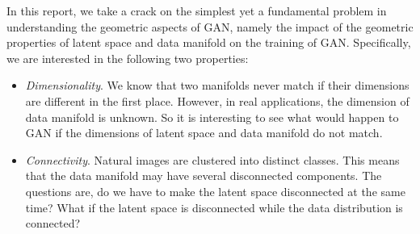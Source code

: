 In this report,
we take a crack on the simplest yet a fundamental problem in
understanding the geometric aspects of GAN,
namely the impact of the geometric properties of
latent space and data manifold on the training of GAN.
Specifically,
we are interested in the following two properties:
\begin{itemize}
    \item \emph{Dimensionality}.
        We know that two manifolds never match
        if their dimensions are different in the first place.
        However, in real applications,
        the dimension of data manifold is unknown.
        So it is interesting to see what would happen to GAN if the dimensions
        of latent space and data manifold do not match.
    \item \emph{Connectivity}.
        Natural images are clustered into distinct classes.
        This means that the data manifold may have several disconnected
        components.
        The questions are,
        do we have to make the latent space disconnected at the same time?
        What if the latent space is disconnected while the data distribution
        is connected?
\end{itemize}
